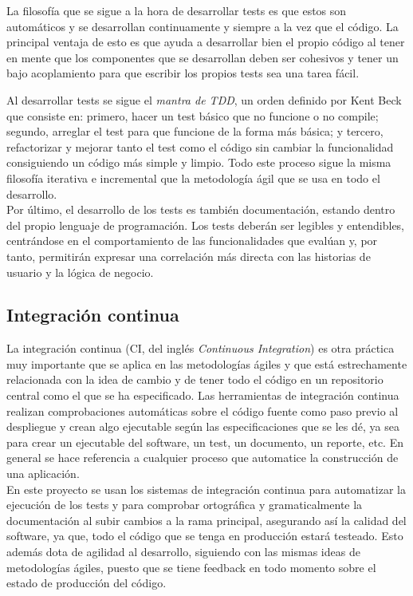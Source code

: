La filosofía que se sigue a la hora de desarrollar tests es que estos son automáticos y se desarrollan continuamente y siempre a la vez que el código. La principal ventaja de esto es que ayuda a desarrollar bien el propio código al tener en mente que los componentes que se desarrollan deben ser cohesivos y tener un bajo acoplamiento para que escribir los propios tests sea una tarea fácil.

Al desarrollar tests se sigue el \textit{mantra de TDD}, un orden definido por Kent Beck \cite{beck2002driven} que consiste en: primero, hacer un test básico que no funcione o no compile; segundo, arreglar el test para que funcione de la forma más básica; y tercero, refactorizar y mejorar tanto el test como el código sin cambiar la funcionalidad consiguiendo un código más simple y limpio. Todo este proceso sigue la misma filosofía iterativa e incremental que la metodología ágil que se usa en todo el desarrollo.\\

Por último, el desarrollo de los tests es también documentación, estando dentro del propio lenguaje de programación. Los tests deberán ser legibles y entendibles, centrándose en el comportamiento de las funcionalidades que evalúan y, por tanto, permitirán expresar una correlación más directa con las historias de usuario y la lógica de negocio.

\subsection{Integración continua}
La integración continua (CI, del inglés \textit{Continuous Integration}) es otra práctica muy importante que se aplica en las metodologías ágiles y que está estrechamente relacionada con la idea de cambio y de tener todo el código en un repositorio central como el que se ha especificado. Las herramientas de integración continua realizan comprobaciones automáticas sobre el código fuente como paso previo al despliegue y crean algo ejecutable según las especificaciones que se les dé, ya sea para crear un ejecutable del software, un test, un documento, un reporte, etc. En general se hace referencia a cualquier proceso que automatice la construcción de una aplicación.\\

En este proyecto se usan los sistemas de integración continua para automatizar la ejecución de los tests y para comprobar ortográfica y gramaticalmente la documentación al subir cambios a la rama principal, asegurando así la calidad del software, ya que, todo el código que se tenga en producción estará testeado. Esto además dota de agilidad al desarrollo, siguiendo con las mismas ideas de metodologías ágiles, puesto que se tiene feedback en todo momento sobre el estado de producción del código.

